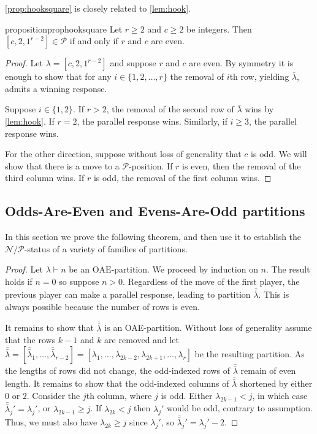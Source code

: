 \documentclass[pdflatex,sn-mathphys-num]{sn-jnl}%
\theoremstyle{thmstyleone}%
\theoremstyle{thmstyletwo}%
\theoremstyle{thmstylethree}%
\newcommand{\p}{\mathcal P}
\newcommand{\n}{\mathcal N}
\newcommand{\OAE}{\mathrm{OAE}}
\begin{document}
\cref{prop:hooksquare} is closely related to \cref{lem:hook}. 


\begin{restatable}{proposition}{prophooksquare} \label{prop:hooksquare}
    Let $r \ge 2$ and $c \ge 2$ be integers.
    Then $[c,2,1^{r-2}] \in \p$ if and only if $r$ and $c$ are even.
\end{restatable}
\begin{proof}
    Let $\lambda = [c,2,1^{r-2}]$ and suppose $r$ and $c$ are even. 
    By symmetry it is enough to show that for any $i\in \{1,2, \dots,r\}$ the removal of $i$th row, yielding $\bar \lambda$, admits a winning response.
    
    Suppose $i\in\{1, 2\}$. If $r > 2$, the removal of the second row of $\bar \lambda$ wins by \cref{lem:hook}.  If $r = 2$, the parallel response wins.
    Similarly, if $i\ge 3$, the parallel response wins. 

    For the other direction, suppose without loss of generality that $c$ is odd. We will show that there is a move to a $\p$-position. If $r$ is even, then the removal of the third column wins. If $r$ is odd, the removal of the first column wins. 
\end{proof}



\subsection{Odds-Are-Even and Evens-Are-Odd partitions}

In this section we prove the following theorem, and then use it to establish the $\n/\p$-status of a variety of families of partitions.
\thmoddsareeven*
\begin{proof}
Let $\lambda \vdash n$ be an $\OAE$-partition. We proceed by induction on $n$.
The result holds if $n=0$ so suppose $n > 0$.
Regardless of the move of the first player, the previous player can make a parallel response, leading to partition $\bar{\bar \lambda}$.
This is always possible because the number of rows is even. 

It remains to show that $\bar{\bar \lambda}$ is an OAE-partition.
Without loss of generality assume that the rows $k-1$ and $k$ are removed and let $\bar{\bar \lambda} = [\bar{\bar \lambda}_1, \ldots, \bar{\bar \lambda}_{r-2}] = [\lambda_1, \ldots, \lambda_{2k-2}, \lambda_{2k+1}, \ldots, \lambda_{r}]$ be the resulting partition. 
As the lengths of rows did not change, the odd-indexed rows of $\bar{\bar \lambda}$ remain of even length. It remains to show that the odd-indexed columns of $\bar{\bar \lambda}$ shortened by either $0$ or $2$. 
Consider the $j$th column, where $j$ is odd. Either $\lambda_{2k-1} < j$, in which case $\bar{\bar \lambda}_j' = \lambda_j'$, or $\lambda_{2k-1} \ge j$. If $\lambda_{2k} < j$ then $\lambda_j'$ would be odd, contrary to assumption. 
Thus, we must also have $\lambda_{2k} \geq j$ since $\lambda_j'$, so $\bar{\bar \lambda}_j' = \lambda_j'-2$. 
\end{proof}
\end{document}
